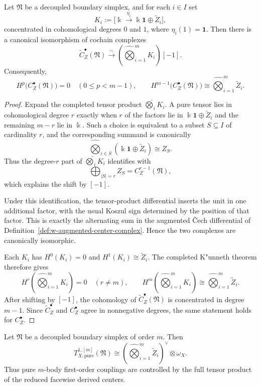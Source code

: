 \begin{theorem}
\label{thm:w-augmented-center-tensor-model}
Let $\mathfrak N$ be a decoupled boundary simplex, and for each $i\in I$ set
\[
K_i:=\bigl[\Bbbk\xrightarrow{\eta_i} \Bbbk\mathbf{1}\oplus \widetilde Z_i\bigr],
\]
concentrated in cohomological degrees $0$ and $1$, where $\eta_i(1)=\mathbf{1}$.
Then there is a canonical isomorphism of cochain complexes
\[
\widetilde C_Z^\bullet(\mathfrak N)
\xrightarrow{\sim}
\left(\widehat\bigotimes_{i=1}^m K_i\right)[-1].
\]
Consequently,
\[
H^p\bigl(C_Z^\bullet(\mathfrak N)\bigr)=0
\quad (0\le p<m-1),
\qquad
H^{m-1}\bigl(C_Z^\bullet(\mathfrak N)\bigr)
\cong
\widehat\bigotimes_{i=1}^m \widetilde Z_i.
\]
\end{theorem}

\begin{proof}
Expand the completed tensor product $\widehat\bigotimes_i K_i$. A pure tensor lies in cohomological
degree $r$ exactly when $r$ of the factors lie in $\Bbbk\mathbf{1}\oplus \widetilde Z_i$ and the remaining
$m-r$ lie in $\Bbbk$. Such a choice is equivalent to a subset $S\subseteq I$ of cardinality $r$, and the
corresponding summand is canonically
\[
\widehat\bigotimes_{i\in S}(\Bbbk\mathbf{1}\oplus \widetilde Z_i)
\cong Z_S.
\]
Thus the degree-$r$ part of $\widehat\bigotimes_i K_i$ identifies with
\[
\bigoplus_{|S|=r} Z_S = C_Z^{r-1}(\mathfrak N),
\]
which explains the shift by $[-1]$.

Under this identification, the tensor-product differential inserts the unit in one additional factor, with
the usual Koszul sign determined by the position of that factor. This is exactly the alternating sum in the
augmented \v{C}ech differential of Definition~\ref{def:w-augmented-center-complex}. Hence the two complexes
are canonically isomorphic.

Each $K_i$ has $H^0(K_i)=0$ and $H^1(K_i)\cong \widetilde Z_i$. The completed K"unneth theorem therefore gives
\[
H^r\left(\widehat\bigotimes_{i=1}^m K_i\right)=0\quad (r\neq m),
\qquad
H^m\left(\widehat\bigotimes_{i=1}^m K_i\right)
\cong
\widehat\bigotimes_{i=1}^m \widetilde Z_i.
\]
After shifting by $[-1]$, the cohomology of $\widetilde C_Z^\bullet(\mathfrak N)$ is concentrated in degree $m-1$.
Since $\widetilde C_Z^\bullet$ and $C_Z^\bullet$ agree in nonnegative degrees, the same statement holds for
$C_Z^\bullet$.
\end{proof}

\begin{corollary}
\label{cor:w-pure-mbody-coupling-theorem}
Let $\mathfrak N$ be a decoupled boundary simplex of order $m$. Then
\[
T^{1,[m]}_{X,\mathrm{pure}}(\mathfrak N)
\cong
\left(\widehat\bigotimes_{i=1}^m \widetilde Z_i\right)^\vee\otimes \omega_X.
\]
Thus pure $m$-body first-order couplings are controlled by the full tensor product of the reduced
facewise derived centers.
\end{corollary}

